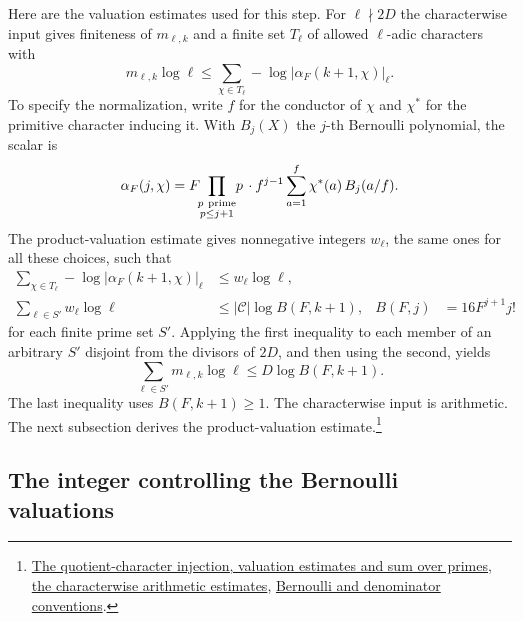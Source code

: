 Here are the valuation estimates used for this step. For
\(\ell\nmid 2D\) the characterwise input gives finiteness of
\(m_{\ell,k}\) and a finite set \(T_\ell\) of allowed \(\ell\)-adic
characters with
\[
     m_{\ell,k}\log\ell
       \le\sum_{\chi\in T_\ell}-\log
              \lvert\alpha_F(k+1,\chi)\rvert_\ell.
\]
To specify the normalization, write \(f\) for the conductor of \(\chi\)
and \(\chi^*\) for the primitive character inducing it. With \(B_j(X)\)
the \(j\)-th Bernoulli polynomial, the scalar is
\[
    \alpha_F(j,\chi)=F\!\!\prod_{\substack{p\ {\rm prime}\\p\le j+1}}\!p
          \,\cdot f^{j-1}\sum_{a=1}^f\chi^*(a)\,B_j(a/f).
\]
The product-valuation estimate gives nonnegative integers \(w_\ell\),
the same ones for
all these choices, such that
\begin{align*}
  \sum_{\chi\in T_\ell}-\log
              \lvert\alpha_F(k+1,\chi)\rvert_\ell
       &\le w_\ell\log\ell,\\
  \sum_{\ell\in S'}w_\ell\log\ell
       &\le\lvert\mathcal C\rvert\log B(F,k+1),&
 B(F,j)&=16F^{j+1}j!
\end{align*}
for each finite prime set \(S'\). Applying the first inequality to
each member of an arbitrary \(S'\) disjoint from the divisors of
\(2D\), and then using the second, yields
\begin{equation}\label{eq:galois-good-prime-sum}
      \sum_{\ell\in S'}m_{\ell,k}\log\ell
          \le D\log B(F,k+1).
\end{equation}
The last inequality uses \(B(F,k+1)\ge1\). The characterwise input is arithmetic. The next subsection
derives the product-valuation estimate.\footnote{\href{https://github.com/Deicyde/riemann-hypothesis/blob/40e56bab/src/Development/AutomorphicArithmetic/AutomorphicVarieties/OddResidueBounds/ThmBcOfPsiBound.lean\#L41-L108}{The quotient-character injection, valuation estimates and sum over primes},
\href{https://github.com/Deicyde/riemann-hypothesis/blob/40e56bab/src/Development/AutomorphicArithmetic/AutomorphicVarieties/OddResidueBounds/ZeroMemUnrHom.lean\#L79-L110}{the characterwise arithmetic estimates},
\href{https://github.com/Deicyde/riemann-hypothesis/blob/40e56bab/src/Development/AutomorphicArithmetic/AutomorphicVarieties/GaloisLibrary/BernoulliNumbers/MapGenBChar.lean\#L9-L31}{Bernoulli and denominator conventions}.}

\subsection{The integer controlling the Bernoulli valuations}

